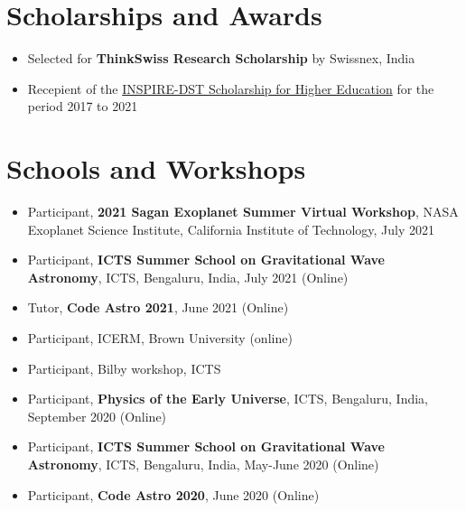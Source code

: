 \documentclass[margin, centered]{res}
\begin{document}
\begin{resume}
\section{Scholarships and Awards}
\begin{itemize}[leftmargin=*]

 \item Selected for \textbf{ThinkSwiss Research Scholarship} by Swissnex, India

 \item Recepient of the \href{http://www.inspire-dst.gov.in/scholarship.html}{INSPIRE-DST Scholarship for Higher Education} for the period 2017 to 2021
\end{itemize}


\section{Schools and Workshops}
\begin{itemize}[leftmargin=*]

    \item Participant, \textbf{2021 Sagan Exoplanet Summer Virtual Workshop}, NASA Exoplanet Science Institute, California Institute of Technology, July 2021 
	\item Participant, \textbf{ICTS Summer School on Gravitational Wave Astronomy}, ICTS, Bengaluru, India, July 2021 (Online)
	\item Tutor, \textbf{Code Astro 2021}, June 2021 (Online)
	\item Participant, ICERM, Brown University (online)
	\item Participant, Bilby workshop, ICTS 
	\item Participant, \textbf{Physics of the Early Universe}, ICTS, Bengaluru, India, September 2020 (Online)
	\item Participant, \textbf{ICTS Summer School on Gravitational Wave Astronomy}, ICTS, Bengaluru, India, May-June 2020 (Online)
	\item Participant, \textbf{Code Astro 2020}, June 2020 (Online)
\end{itemize}


\end{resume}
\end{document}
